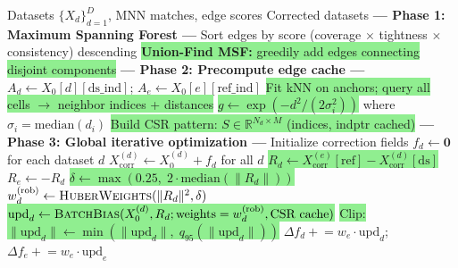 \documentclass[8pt]{article}
\begin{document}
\newpage

\begin{tcolorbox}[
    title={\textbf{Algorithm 2b:} scanorama\_optimized --- MSF + Global Symmetric Iterative Optimization},
    colback=lightgreen!20, colframe=added!80, fonttitle=\small\bfseries,
    boxrule=0.5pt, arc=2pt, left=4pt, right=4pt, top=2pt, bottom=2pt
]
\begin{algorithmic}[1]
\small
\Require Datasets $\{X_d\}_{d=1}^D$, MNN matches, edge scores
\Ensure Corrected datasets
\State \textbf{--- Phase 1: Maximum Spanning Forest ---}
\State Sort edges by score (coverage $\times$ tightness $\times$ consistency) descending
\State \colorbox{lightgreen}{\textbf{Union-Find MSF:} greedily add edges connecting disjoint components} \Comment{\textcolor{added}{No redundant paths}}
\State \textbf{--- Phase 2: Precompute edge cache ---}
    \State $A_d \gets X_0[d][\text{ds\_ind}]$; \quad $A_e \gets X_0[e][\text{ref\_ind}]$ 
    \State \colorbox{lightgreen}{Fit kNN on anchors; query all cells $\to$ neighbor indices + distances}
    \State \colorbox{lightgreen}{$g \gets \exp(-d^2 / (2\sigma_i^2))$} where $\sigma_i = \text{median}(d_i)$ \Comment{\textcolor{added}{Precomputed Gaussian}}
    \State \colorbox{lightgreen}{Build CSR pattern: $S \in \mathbb{R}^{N_d \times M}$ (indices, indptr cached)}
\EndFor
\State \textbf{--- Phase 3: Global iterative optimization ---}
\State Initialize correction fields $f_d \gets \mathbf{0}$ for each dataset $d$
 
    \State $X_\text{corr}^{(d)} \gets X_0^{(d)} + f_d$ for all $d$ 
        \State \colorbox{lightgreen}{$R_d \gets X_\text{corr}^{(e)}[\text{ref}] - X_\text{corr}^{(d)}[\text{ds}]$} \Comment{\textcolor{added}{Symmetric residuals}}
        \State $R_e \gets -R_d$
        \State \colorbox{lightgreen}{$\delta \gets \max(0.25,\; 2 \cdot \text{median}(\|R_d\|))$} \Comment{\textcolor{added}{Adaptive Huber threshold}}
        \State $w_d^{(\text{rob})} \gets \textsc{HuberWeights}(\|R_d\|^2, \delta)$ 
        \State \colorbox{lightgreen}{$\text{upd}_d \gets \textsc{BatchBias}(X_0^{(d)}, R_d; \text{weights}=w_d^{(\text{rob})}, \text{CSR cache})$} \Comment{\textcolor{added}{Precomputed kNN + CSR}}
        \State \colorbox{lightgreen}{Clip: $\|\text{upd}_d\| \gets \min(\|\text{upd}_d\|, \; q_{95}(\|\text{upd}_d\|))$} \Comment{\textcolor{added}{95th percentile cap}}
        \State $\Delta f_d \mathrel{+}= w_e \cdot \text{upd}_d$; \quad $\Delta f_e \mathrel{+}= w_e \cdot \text{upd}_e$

\end{algorithmic}
\end{tcolorbox}
\end{document}
